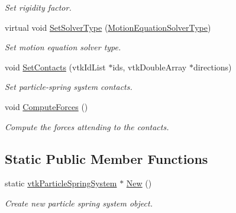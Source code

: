 \begin{DoxyCompactItemize}
\begin{DoxyCompactList}\small\item\em Set rigidity factor. \item\end{DoxyCompactList}\item 
\hypertarget{classvtkParticleSpringSystem_acc7b8fc87261e73dfe79c8f879db7bab}{
virtual void \hyperlink{classvtkParticleSpringSystem_acc7b8fc87261e73dfe79c8f879db7bab}{SetSolverType} (\hyperlink{classvtkParticleSpringSystem_abbafd0d91c7eb36d96000bc5004709cf}{MotionEquationSolverType})}
\label{classvtkParticleSpringSystem_acc7b8fc87261e73dfe79c8f879db7bab}

\begin{DoxyCompactList}\small\item\em Set motion equation solver type. \item\end{DoxyCompactList}\item 
void \hyperlink{classvtkParticleSpringSystem_a83abe622cf6efc6018bacb06634b28ab}{SetContacts} (vtkIdList $\ast$ids, vtkDoubleArray $\ast$directions)
\begin{DoxyCompactList}\small\item\em Set particle-\/spring system contacts. \item\end{DoxyCompactList}\item 
void \hyperlink{classvtkParticleSpringSystem_aff8c9dfdb8701c016a25783e7d69dc49}{ComputeForces} ()
\begin{DoxyCompactList}\small\item\em Compute the forces attending to the contacts. \item\end{DoxyCompactList}\end{DoxyCompactItemize}
\subsection*{Static Public Member Functions}
\begin{DoxyCompactItemize}
\item 
\hypertarget{classvtkParticleSpringSystem_ac2f3232b48a3306e293011dc6fa1128c}{
static \hyperlink{classvtkParticleSpringSystem}{vtkParticleSpringSystem} $\ast$ \hyperlink{classvtkParticleSpringSystem_ac2f3232b48a3306e293011dc6fa1128c}{New} ()}
\label{classvtkParticleSpringSystem_ac2f3232b48a3306e293011dc6fa1128c}

\begin{DoxyCompactList}\small\item\em Create new particle spring system object. \item\end{DoxyCompactList}\end{DoxyCompactItemize}
